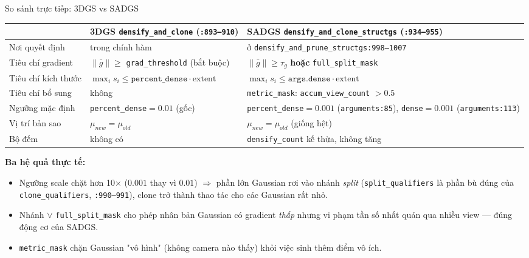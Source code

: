 \begin{frame}{So sánh trực tiếp: 3DGS vs SADGS}
\scriptsize
\begin{center}
\begin{tabular}{p{3.1cm}|p{4.5cm}|p{4.9cm}}
\hline
 & \textbf{3DGS} \texttt{densify\_and\_clone} (\texttt{:893--910}) & \textbf{SADGS} \texttt{densify\_and\_clone\_structgs} (\texttt{:934--955}) \\
\hline
Nơi quyết định & trong chính hàm & ở \texttt{densify\_and\_prune\_structgs:998--1007} \\
Tiêu chí gradient & $\|\bar g\|\ge$ \texttt{grad\_threshold} (bắt buộc) & $\|\bar g\|\ge\tau_g$ \textbf{hoặc} \texttt{full\_split\_mask} \\
Tiêu chí kích thước & $\max_i s_i \le \texttt{percent\_dense}\cdot\text{extent}$ & $\max_i s_i \le \texttt{args.dense}\cdot\text{extent}$ \\
Tiêu chí bổ sung & không & \texttt{metric\_mask}: \texttt{accum\_view\_count} $>0.5$ \\
Ngưỡng mặc định & \texttt{percent\_dense}$=0.01$ (gốc) & \texttt{percent\_dense}$=0.001$ (\texttt{arguments:85}), \texttt{dense}$=0.001$ (\texttt{arguments:113}) \\
Vị trí bản sao & $\mu_{new}=\mu_{old}$ & $\mu_{new}=\mu_{old}$ (giống hệt) \\
Bộ đếm & không có & \texttt{densify\_count} kế thừa, không tăng \\
\hline
\end{tabular}
\end{center}
\vspace{3pt}
\textbf{Ba hệ quả thực tế:}
\begin{itemize}
\item Ngưỡng scale chặt hơn 10$\times$ ($0.001$ thay vì $0.01$) $\Rightarrow$ phần lớn Gaussian rơi vào nhánh \emph{split} (\texttt{split\_qualifiers} là phần bù đúng của \texttt{clone\_qualifiers}, \texttt{:990--991}), clone trở thành thao tác cho các Gaussian rất nhỏ.
\item Nhánh $\vee$ \texttt{full\_split\_mask} cho phép nhân bản Gaussian có gradient \emph{thấp} nhưng vi phạm tần số nhất quán qua nhiều view — đúng động cơ của SADGS.
\item \texttt{metric\_mask} chặn Gaussian "vô hình" (không camera nào thấy) khỏi việc sinh thêm điểm vô ích.
\end{itemize}
\end{frame}


